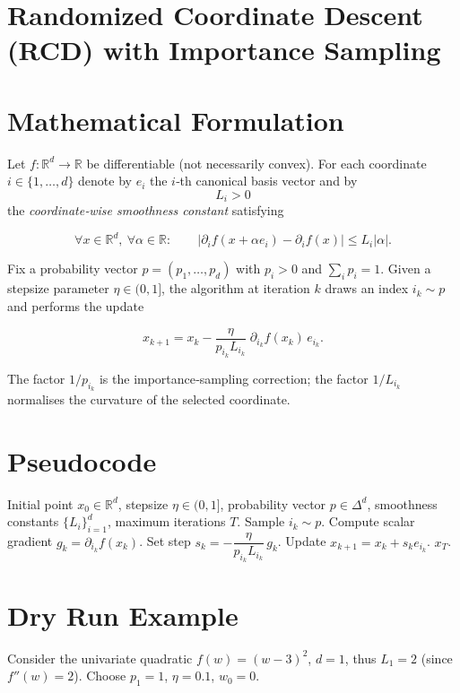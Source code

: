 \documentclass{article}
\newcommand{\R}{\mathbb{R}}
\begin{document}
\section*{Randomized Coordinate Descent (RCD) with Importance Sampling}

\section*{Mathematical Formulation}
Let $f:\R^{d}\rightarrow\R$ be differentiable (not necessarily convex).  
For each coordinate $i\in\{1,\dots ,d\}$ denote by $e_i$ the $i$‑th canonical basis vector and by
\[
L_i>0
\]
the \emph{coordinate‑wise smoothness constant} satisfying  

\[
\forall x\in\R^{d},\ \forall \alpha\in\R:\qquad 
\big|\partial_i f(x+\alpha e_i)-\partial_i f(x)\big|\le L_i|\alpha|.
\tag{1}
\]

Fix a probability vector $p=(p_1,\dots ,p_d)$ with $p_i>0$ and $\sum_i p_i=1$.
Given a stepsize parameter $\eta\in(0,1]$, the algorithm at iteration $k$ draws an index
$i_k\sim p$ and performs the update  

\[
x_{k+1}=x_k-\frac{\eta}{p_{i_k}L_{i_k}}\;\partial_{i_k}f(x_k)\,e_{i_k}.
\tag{2}
\]

The factor $1/p_{i_k}$ is the importance‑sampling correction; the factor $1/L_{i_k}$
normalises the curvature of the selected coordinate.

\section*{Pseudocode}
\begin{algorithm}[H]
\caption{Randomized Coordinate Descent with Importance Sampling}
\begin{algorithmic}[1]
\REQUIRE Initial point $x_0\in\R^{d}$, stepsize $\eta\in(0,1]$, probability vector $p\in\Delta^{d}$, smoothness constants $\{L_i\}_{i=1}^{d}$, maximum iterations $T$.
    \STATE Sample $i_k\sim p$.
    \STATE Compute scalar gradient $g_{k}= \partial_{i_k}f(x_k)$.
    \STATE Set step $s_{k}= -\dfrac{\eta}{p_{i_k}L_{i_k}}\,g_{k}$.
    \STATE Update $x_{k+1}=x_k + s_{k}e_{i_k}$.
\ENDFOR
\RETURN $x_T$.
\end{algorithmic}
\end{algorithm}

\section*{Dry Run Example}
Consider the univariate quadratic $f(w)=(w-3)^2$, $d=1$, thus $L_1=2$ (since $f''(w)=2$).  
Choose $p_1=1$, $\eta=0.1$, $w_0=0$.
\end{document}
